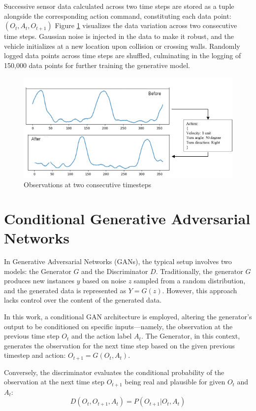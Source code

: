 \documentclass[12pt,twoside,a4paper,parskip]{scrbook} %
\begin{document}
Successive sensor data calculated across two time steps are stored as a tuple alongside the corresponding action command, constituting each data point: \((O_t, A_t, O_{t+1})\)
Figure \ref{fig:befaft} visualizes the data variation across two consecutive time steps. Gaussian noise is injected in the data to make it robust, and the vehicle initializes at a new location upon collision or crossing walls. Randomly logged data points across time steps are shuffled, culminating in the logging of 150,000 data points for further training the generative model.
\begin{figure}[h]
    \centering
    \includegraphics[width=1\textwidth]{Images/before after.png}
    \caption{Observations at two consecutive timesteps}
    \label{fig:befaft}
  \end{figure}

\section{Conditional Generative Adversarial Networks}
In Generative Adversarial Networks (GANs), the typical setup involves two models: the Generator \(G\) and the Discriminator \(D\). Traditionally, the generator \(G\) produces new instances \(y\) based on noise \(z\) sampled from a random distribution, and the generated data is represented as \(Y = G(z)\). However, this approach lacks control over the content of the generated data.

In this work, a conditional GAN architecture is employed, altering the generator's output to be conditioned on specific inputs—namely, the observation at the previous time step \(O_t\) and the action label \(A_t\). The Generator, in this context, generates the observation for the next time step based on the given previous timestep and action: \(O_{t+1} = G(O_t, A_t)\).

Conversely, the discriminator evaluates the conditional probability of the observation at the next time step \(O_{t+1}\) being real and plausible for given \(O_t\) and \(A_t\):
\[D(O_t, O_{t+1}, A_t) = P(O_{t+1} | O_t, A_t)\]
\end{document}
